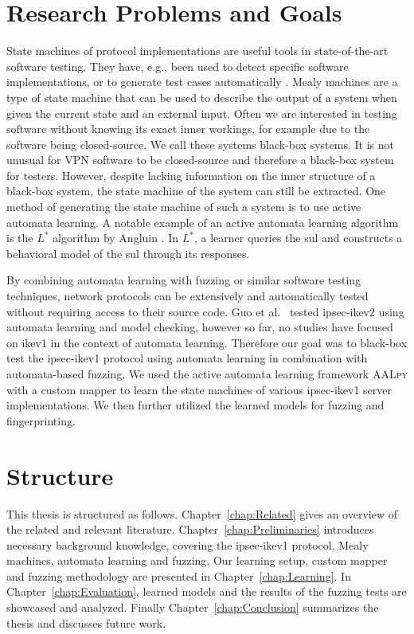\section{Research Problems and Goals}
State machines of protocol implementations are useful tools in state-of-the-art software testing. They have, e.g., been used to detect specific software implementations, or to generate test cases automatically \cite{pferscher2021fingerprinting, pferscher2022fuzzing}. Mealy machines are a type of state machine that can be used to describe the output of a system when given the current state and an external input. Often we are interested in testing software without knowing its exact inner workings, for example due to the software being closed-source. We call these systems black-box systems. It is not unusual for VPN software to be closed-source and therefore a black-box system for testers. However, despite lacking information on the inner structure of a black-box system, the state machine of the system can still be extracted. One method of generating the state machine of such a system is to use active automata learning. A notable example of an active automata learning algorithm is the $L^*$ algorithm by Angluin \cite{angluin1987learning}. In $L^*$, a learner queries the \ac{sul} and constructs a behavioral model of the \ac{sul} through its responses. 

By combining automata learning with fuzzing or similar software testing techniques, network protocols can be extensively and automatically tested without requiring access to their source code. Guo et al.~\cite{guo2019model} tested \ac{ipsec}-\ac{ike}v2 using automata learning and model checking, however so far, no studies have focused on \ac{ike}v1 in the context of automata learning. Therefore our goal was to black-box test the \ac{ipsec}-\ac{ike}v1 protocol using automata learning in combination with automata-based fuzzing. We used the active automata learning framework \textsc{AALpy} \cite{muvskardin2022aalpy} with a custom mapper to learn the state machines of various \ac{ipsec}-\ac{ike}v1 server implementations. We then further utilized the learned models for fuzzing and fingerprinting. %

\section{Structure}
This thesis is structured as follows. Chapter~\ref{chap:Related} gives an overview of the related and relevant literature. Chapter~\ref{chap:Preliminaries} introduces necessary background knowledge, covering the \ac{ipsec}-\ac{ike}v1 protocol, Mealy machines, automata learning and fuzzing. Our learning setup, custom mapper and fuzzing methodology are presented in Chapter~\ref{chap:Learning}. In Chapter~\ref{chap:Evaluation}, learned models and the results of the fuzzing tests are showcased and analyzed.
Finally Chapter~\ref{chap:Conclusion} summarizes the thesis and discusses future work.
